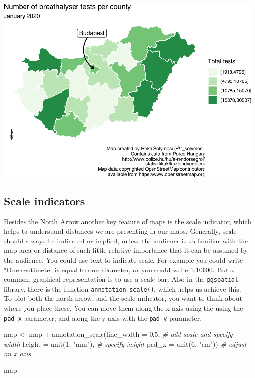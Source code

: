 \documentclass[
  krantz2]{krantz}
\makeatletter
\newenvironment{Shaded}{\begin{snugshade}}{\end{snugshade}}
\newcommand{\AttributeTok}[1]{\textcolor[rgb]{0.61,0.61,0.61}{#1}}
\newcommand{\CommentTok}[1]{\textcolor[rgb]{0.37,0.37,0.37}{\textit{#1}}}
\newcommand{\DecValTok}[1]{\textcolor[rgb]{0.06,0.06,0.06}{#1}}
\newcommand{\FloatTok}[1]{\textcolor[rgb]{0.06,0.06,0.06}{#1}}
\newcommand{\FunctionTok}[1]{\textcolor[rgb]{0,0,0}{#1}}
\newcommand{\NormalTok}[1]{#1}
\newcommand{\OtherTok}[1]{\textcolor[rgb]{0.37,0.37,0.37}{#1}}
\newcommand{\SpecialCharTok}[1]{\textcolor[rgb]{0,0,0}{#1}}
\newcommand{\StringTok}[1]{\textcolor[rgb]{0.5,0.5,0.5}{#1}}
\newenvironment{kframe}{%
\medskip{}
\setlength{\fboxsep}{.8em}
 \def\at@end@of@kframe{}%
 \ifinner\ifhmode%
  \def\at@end@of@kframe{\end{minipage}}%
  \begin{minipage}{\columnwidth}%
 \fi\fi%
 \def\FrameCommand##1{\hskip\@totalleftmargin \hskip-\fboxsep
 \colorbox{shadecolor}{##1}\hskip-\fboxsep
     \hskip-\linewidth \hskip-\@totalleftmargin \hskip\columnwidth}%
 \MakeFramed {\advance\hsize-\width
   \@totalleftmargin\z@ \linewidth\hsize
   \@setminipage}}%
 {\par\unskip\endMakeFramed%
 \at@end@of@kframe}
\renewenvironment{Shaded}{\begin{kframe}}{\end{kframe}}
\makeatother
\begin{document}
\includegraphics{crime_mapping_files/figure-latex/orientationarrowstyle-1.pdf}

\hypertarget{scale-indicators}{%
\subsection{Scale indicators}\label{scale-indicators}}

Besides the North Arrow another key feature of maps is the scale indicator, which helps to understand distances we are presenting in our maps. Generally, scale should always be indicated or implied, unless the audience is so familiar with the map area or distance of such little relative importance that it can be assumed by the audience. You could use text to indicate scale. For example you could write "One centimeter is equal to one kilometer, or you could write 1:10000. But a common, graphical representation is to use a scale bar. Also in the \texttt{ggspatial} library, there is the function \texttt{annotation\_scale()}, which helps us achieve this. To plot both the north arrow, and the scale indicator, you want to think about where you place these. You can move them along the x-axis using the using the \texttt{pad\_x} parameter, and along the y-axis with the \texttt{pad\_y} parameter.

\begin{Shaded}
\begin{Highlighting}[]
\NormalTok{map }\OtherTok{\textless{}{-}}\NormalTok{ map }\SpecialCharTok{+} 
  \FunctionTok{annotation\_scale}\NormalTok{(}\AttributeTok{line\_width =} \FloatTok{0.5}\NormalTok{,      }\CommentTok{\# add scale and specify width}
                   \AttributeTok{height =} \FunctionTok{unit}\NormalTok{(}\DecValTok{1}\NormalTok{, }\StringTok{"mm"}\NormalTok{), }\CommentTok{\# specify height}
                   \AttributeTok{pad\_x =} \FunctionTok{unit}\NormalTok{(}\DecValTok{6}\NormalTok{, }\StringTok{"cm"}\NormalTok{))  }\CommentTok{\# adjust on x axis}

\NormalTok{map}
\end{Highlighting}
\end{Shaded}
\end{document}
